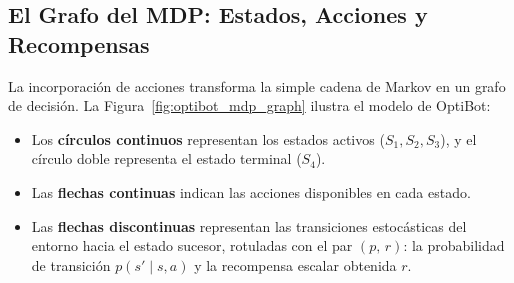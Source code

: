 \subsection{El Grafo del MDP: Estados, Acciones y Recompensas}
La incorporación de acciones transforma la simple cadena de Markov en un grafo de decisión. La Figura~\ref{fig:optibot_mdp_graph} ilustra el modelo de OptiBot:
\begin{itemize}
  \item Los \textbf{círculos continuos} representan los estados activos ($S_1, S_2, S_3$), y el círculo doble representa el estado terminal ($S_4$).
  \item Las \textbf{flechas continuas} indican las acciones disponibles en cada estado.
  \item Las \textbf{flechas discontinuas} representan las transiciones estocásticas del entorno hacia el estado sucesor, rotuladas con el par $(p, \, r)$: la probabilidad de transición $p(s' \mid s, a)$ y la recompensa escalar obtenida $r$.
\end{itemize}

